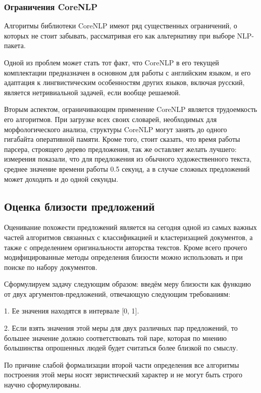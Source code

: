 
\subsubsection{Ограничения CoreNLP}

Алгоритмы библиотеки CoreNLP имеют ряд существенных ограничений, 
о которых не стоит забывать, рассматривая его как альтернативу
при выборе NLP-пакета.

Одной из проблем может стать тот факт, что CoreNLP в его текущей комплектации
предназначен в основном для работы с английским языком, 
и его адаптация к лингвистическим особенностям других языков, включая русский,
является нетривиальной задачей, если вообще решаемой.

Вторым аспектом, ограничивающим применение CoreNLP является трудоемкость
его алгоритмов. При загрузке всех своих словарей, необходимых для морфологического
анализа, структуры CoreNLP могут занять до одного гигабайта оперативной памяти.
Кроме того, стоит сказать, что время работы парсера, строящего дерево предложения,
так же оставляет желать лучшего: измерения показали, что для предложения
из обычного художественного текста, среднее значение времени работы 0.5 секунд,
а в случае сложных предложений может доходить и до одной секунды.

\subsection{Оценка близости предложений}
Оценивание похожести предложений является на сегодня одной из самых важных
частей алгоритмов связанных с классификацией и кластеризацией документов, а также
с определением оригинальности авторства текстов. Кроме всего прочего модифицированные методы определения
близости можно использовать и при поиске по набору документов.

Сформулируем задачу следующим образом:
введём меру близости как функцию от двух аргументов-предложений, отвечающую следующим требованиям:

1. Ее значения находятся в интервале [0, 1].

2. Если взять значения этой меры для двух различных пар предложений, 
то большее значение должно соответствовать той паре, которая по мнению
большинства опрошенных людей будет считаться более близкой по смыслу.

По причине слабой формализации второй части определения все алгоритмы 
построения этой меры носят эвристический характер и не могут быть строго научно сформулированы.


